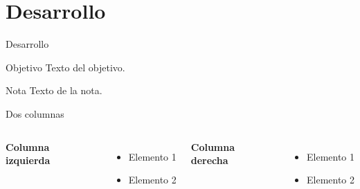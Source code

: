 \documentclass[aspectratio=169]{beamer}
\begin{document}
\section{Desarrollo}
\begin{frame}{Desarrollo}
  \begin{block}{Objetivo}
    Texto del objetivo.
  \end{block}
  \begin{alertblock}{Nota}
    Texto de la nota.
  \end{alertblock}
\end{frame}

\begin{frame}{Dos columnas}
  \begin{columns}
    \textbf{Columna izquierda}
    \begin{itemize}
      \item Elemento 1
      \item Elemento 2
    \end{itemize}
    \textbf{Columna derecha}
    \begin{itemize}
      \item Elemento 1
      \item Elemento 2
    \end{itemize}
  \end{columns}
\end{frame}
\end{document}

